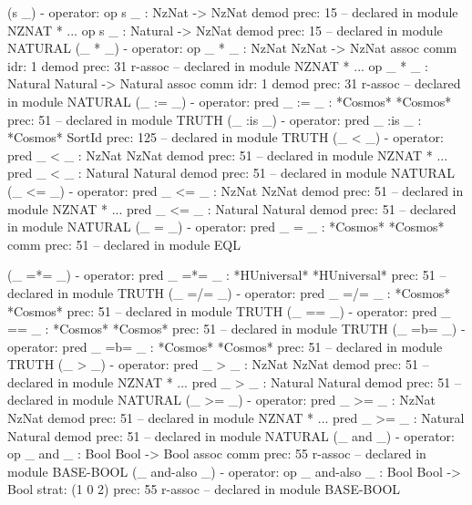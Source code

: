 \documentclass[a4paper,oneside,10pt]{memoir}
\newenvironment{vvtm}%
{\parskip=0pt\lineskip=0pt\begin{center}\begin{minipage}{0.8\textwidth}\begin{snugshade}}%
  {\end{snugshade}\end{minipage}\end{center}}
\begin{document}
\begin{vvtm}
\begin{examplev}
(s _)     
  - operator:
    op s _ : NzNat -> NzNat { demod prec: 15 }
        -- declared in module NZNAT * { ... }
    op s _ : Natural -> NzNat { demod prec: 15 }
        -- declared in module NATURAL
(_ * _)   
  - operator:
    op _ * _ : NzNat NzNat -> NzNat { assoc comm idr: 1 demod prec: 31
                                      r-assoc }
        -- declared in module NZNAT * { ... }
    op _ * _ : Natural Natural -> Natural { assoc comm idr: 1 demod
                                            prec: 31 r-assoc }
        -- declared in module NATURAL
(_ := _)  
  - operator:
    pred _ := _ : *Cosmos* *Cosmos*  { prec: 51 }
        -- declared in module TRUTH
(_ :is _) 
  - operator:
    pred _ :is _ : *Cosmos* SortId  { prec: 125 }
        -- declared in module TRUTH
(_ < _)   
  - operator:
    pred _ < _ : NzNat NzNat  { demod prec: 51 }
        -- declared in module NZNAT * { ... }
    pred _ < _ : Natural Natural  { demod prec: 51 }
        -- declared in module NATURAL
(_ <= _)  
  - operator:
    pred _ <= _ : NzNat NzNat  { demod prec: 51 }
        -- declared in module NZNAT * { ... }
    pred _ <= _ : Natural Natural  { demod prec: 51 }
        -- declared in module NATURAL
(_ = _)   
  - operator:
    pred _ = _ : *Cosmos* *Cosmos*  { comm prec: 51 }
        -- declared in module EQL
\end{examplev}
\end{vvtm}
\begin{vvtm}
\begin{examplev}
(_ =*= _) 
  - operator:
    pred _ =*= _ : *HUniversal* *HUniversal*  { prec: 51 }
        -- declared in module TRUTH
(_ =/= _) 
  - operator:
    pred _ =/= _ : *Cosmos* *Cosmos*  { prec: 51 }
        -- declared in module TRUTH
(_ == _)  
  - operator:
    pred _ == _ : *Cosmos* *Cosmos*  { prec: 51 }
        -- declared in module TRUTH
(_ =b= _) 
  - operator:
    pred _ =b= _ : *Cosmos* *Cosmos*  { prec: 51 }
        -- declared in module TRUTH
(_ > _)   
  - operator:
    pred _ > _ : NzNat NzNat  { demod prec: 51 }
        -- declared in module NZNAT * { ... }
    pred _ > _ : Natural Natural  { demod prec: 51 }
        -- declared in module NATURAL
(_ >= _)  
  - operator:
    pred _ >= _ : NzNat NzNat  { demod prec: 51 }
        -- declared in module NZNAT * { ... }
    pred _ >= _ : Natural Natural  { demod prec: 51 }
        -- declared in module NATURAL
(_ and _) 
  - operator:
    op _ and _ : Bool Bool -> Bool { assoc comm prec: 55 r-assoc }
        -- declared in module BASE-BOOL
(_ and-also _) 
  - operator:
    op _ and-also _ : Bool Bool -> Bool { strat: (1 0 2) prec: 55
                                          r-assoc }
        -- declared in module BASE-BOOL
\end{examplev}
\end{vvtm}
\end{document}
